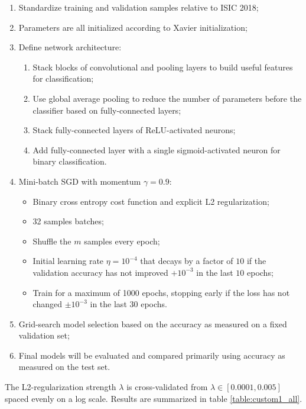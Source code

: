 \begin{enumerate}
    \item Standardize training and validation samples relative to \ac{ISIC} 2018;
    \item Parameters are all initialized according to Xavier initialization;
    \item Define network architecture:
        \begin{enumerate}
            \item Stack blocks of convolutional and pooling layers to build useful features for classification;
            \item Use global average pooling to reduce the number of parameters before the classifier based on fully-connected layers;
            \item Stack fully-connected layers of ReLU-activated neurons;
            \item Add fully-connected layer with a single sigmoid-activated neuron for binary classification.
        \end{enumerate}
    \item Mini-batch \ac{SGD} with momentum $\gamma = 0.9$:
        \begin{itemize}
            \item Binary cross entropy cost function and explicit L2 regularization;
            \item 32 samples batches;
            \item Shuffle the $m$ samples every epoch;
            \item Initial learning rate $\eta = 10^{-4}$ that decays by a factor of $10$ if the validation accuracy has not improved $+10^{-3}$ in the last $10$ epochs;
            \item Train for a maximum of 1000 epochs, stopping early if the loss has not changed $\pm 10^{-3}$ in the last $30$ epochs.
        \end{itemize}
    \item Grid-search model selection based on the accuracy as measured on a fixed validation set;
    \item Final models will be evaluated and compared primarily using accuracy as measured on the test set.
\end{enumerate}

The L2-regularization strength $\lambda$ is cross-validated from $\lambda \in [0.0001, 0.005]$ spaced evenly on a log scale. Results are summarized in table \ref{table:custom1_all}.

